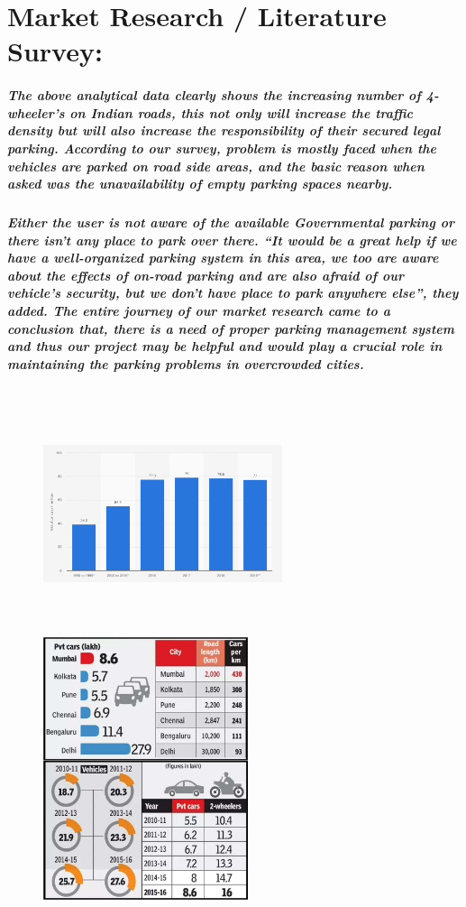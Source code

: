 \documentclass[]{article}
\begin{document}
\section{Market Research / Literature Survey:}
\subparagraph{The above analytical data clearly shows the increasing number of 4-wheeler’s on Indian roads, this not only will increase the traffic density but will also increase the responsibility of their secured legal parking. According to our survey, problem is mostly faced when the vehicles are parked on road side areas, and the basic reason when asked was the unavailability of empty parking spaces nearby.}
\subparagraph{Either the user is not aware of the available Governmental parking or there isn’t any place to park over there. “It would be a great help if we have a well-organized parking system in this area, we too are aware about the effects of on-road parking and are also afraid of our vehicle’s security, but we don’t have place to park anywhere else”, they added. The entire journey of our market research came to a conclusion that, there is a need of proper parking management system and thus our project may be helpful and would play a crucial role in maintaining the parking problems in overcrowded cities.}
\begin{figure}[ht]
    \begin{center}
    \includegraphics[width=7cm,height=7cm]{img2.png}
    \includegraphics[width=6cm]{img.jpg}
    \end{center}
    \end{figure}
\end{document}
